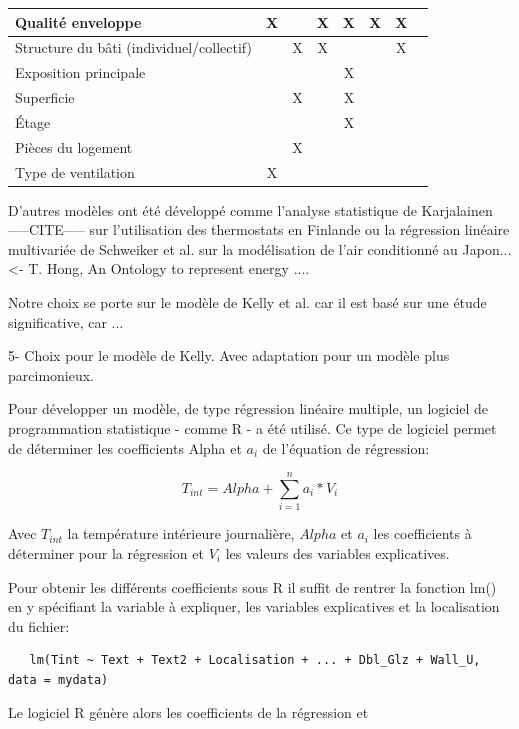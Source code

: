 \begin{table} [H]
\begin{tabular}{|l||c|c|c|c|c|c|c|}
\hline Qualité enveloppe & X & & X & X & X & X & \\
\hline Structure du bâti (individuel/collectif) & & X & X & & & X & \\
\hline Exposition principale & & & & X & & & \\
\hline Superficie & & X & & X & & & \\
\hline Étage & & & & X & & & \\
\hline Pièces du logement & & X & & & & & \\
\hline Type de ventilation & X & & & & & & \\
\hline 
\end{tabular}
\end{table}

D'autres modèles ont été développé comme l'analyse statistique de Karjalainen -----CITE----- sur l'utilisation des thermostats en Finlande ou la régression linéaire multivariée de Schweiker et al. sur la modélisation de l'air conditionné au Japon... <- T. Hong, An Ontology to represent energy ....

Notre choix se porte sur le modèle de Kelly et al. car il est basé sur une étude significative, car ...

5- Choix pour le modèle de Kelly. Avec adaptation pour un modèle plus parcimonieux.

Pour développer un modèle, de type régression linéaire multiple, un logiciel de programmation statistique - comme R - a été utilisé. Ce type de logiciel permet de déterminer les coefficients Alpha et $a_{i}$ de l'équation de régression:

\begin{equation}
T_{int} = Alpha + \sum\limits_{i=1}^n a_{i} * V_{i} 
\end{equation}

Avec $T_{int}$ la température intérieure journalière, $Alpha$ et $a_{i}$ les coefficients à déterminer pour la régression et $V_{i}$ les valeurs des variables explicatives.

Pour obtenir les différents coefficients sous R il suffit de rentrer la fonction lm() en y spécifiant la variable à expliquer, les variables explicatives et la localisation du fichier:
\begin{verbatim}
   lm(Tint ~ Text + Text2 + Localisation + ... + Dbl_Glz + Wall_U, data = mydata)
\end{verbatim}

Le logiciel R génère alors les coefficients de la régression et 

